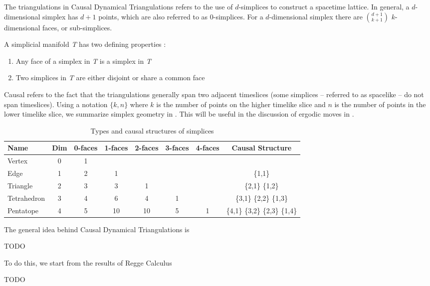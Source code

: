 \documentclass[12pt]{article}
\begin{document}
The triangulations in Causal Dynamical Triangulations refers to the use of $d$-simplices to construct a spacetime lattice. In general, a $d$-dimensional simplex has $d+1$ points, which are also referred to as $0$-simplices. For a $d$-dimensional simplex there are $\binom{d+1}{k+1}$ $k$-dimensional faces, or sub-simplices.

A simplicial manifold \textit{T} has two defining properties \cite{cgal:eb-12b}:

\begin{enumerate}
  \item Any face of a simplex in \textit{T} is a simplex in \textit{T}
  \item Two simplices in \textit{T} are either disjoint or share a common face
\end{enumerate}

Causal refers to the fact that the triangulations generally span two adjacent timeslices (some simplices -- referred to as spacelike -- do not span timeslices). Using a notation $\{k,n\}$ where $k$ is the number of points on the higher timelike slice and $n$ is the number of points in the lower timelike slice, we summarize simplex geometry in . This will be useful in the discussion of ergodic moves in .

\begin{table}
\centering
\begin{tabular}{|l|c|c|c|c|c|c|c|}
\hline
Name & Dim & 0-faces & 1-faces & 2-faces & 3-faces & 4-faces & Causal Structure \\
\hline
\hline
Vertex & 0 & 1 & & & & & \\
Edge & 1 & 2 & 1 & & & & \{1,1\} \\
Triangle & 2 & 3 & 3 & 1 & & & \{2,1\} \{1,2\}\\
Tetrahedron & 3 & 4 & 6 & 4 & 1 & & \{3,1\} \{2,2\} \{1,3\} \\
Pentatope & 4 & 5 & 10 & 10 & 5 & 1 & \{4,1\} \{3,2\} \{2,3\} \{1,4\} \\
\hline
\end{tabular}
\caption[Simplex types]{Types and causal structures of simplices}
\label{table:simplices}
\end{table}

The general idea behind Causal Dynamical Triangulations is

TODO

To do this, we start from the results of Regge Calculus \cite{regge}

TODO
\end{document}
